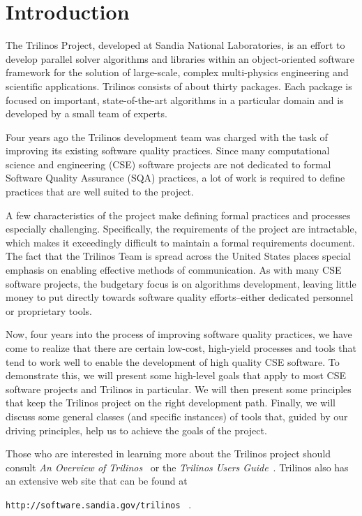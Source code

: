 \documentclass[12pt,relax]{article}
\newcommand{\InlineDirectory}[1]{
  {\hspace{0.01 in}} {\tt #1} {\hspace{0.01 in}}}
\begin{document}

\section{Introduction}
\label{Section:Introduction}


The Trilinos Project, developed at Sandia National Laboratories, is an effort
to develop parallel solver algorithms and libraries within an object-oriented
software framework for the solution of large-scale, complex multi-physics
engineering and scientific applications.  Trilinos consists of about thirty
packages.  Each package is focused on important, state-of-the-art algorithms
in a particular domain and is developed by a small team of experts.

Four years ago the Trilinos development team was charged with the task of
improving its existing software quality practices.  Since many computational
science and engineering (CSE) software projects are not dedicated to formal
Software Quality Assurance (SQA) practices, a lot of work is required to define
practices that are well suited to the project.

A few characteristics of the project make defining formal practices and
processes especially challenging.  Specifically, the requirements of the
project are intractable, which makes it exceedingly difficult to maintain a
formal requirements document.  The fact that the Trilinos Team is spread
across the United States places special emphasis on enabling effective methods
of communication.  As with many CSE software projects, the budgetary focus is
on algorithms development, leaving little money to put directly towards
software quality efforts--either dedicated personnel or proprietary tools.

Now, four years into the process of improving software quality practices, we 
have come to realize that there are certain low-cost, high-yield processes and
tools that tend to work well to enable the development of high quality CSE
software.  To demonstrate this, we will present some high-level goals that 
apply to most CSE software projects and Trilinos in particular.  We will then
present some principles that keep the Trilinos project on the right development
path.  Finally, we will discuss some general classes (and specific instances)
of tools that, guided by our driving principles, help us to achieve the goals
of the project.

Those who are interested in learning more about the Trilinos project should
consult {\it An Overview of Trilinos}~\cite{Trilinos-Overview} or the
{\it Trilinos Users Guide}~\cite{Trilinos-Users-Guide}.  Trilinos also has an
extensive web site that can be found at \newline
\InlineDirectory{http://software.sandia.gov/trilinos}~\cite{Trilinos-home-page}.
\end{document}
